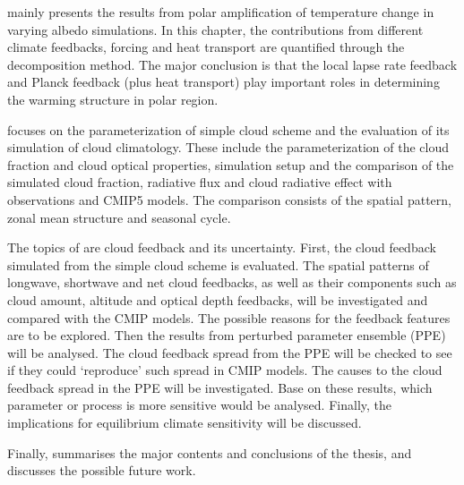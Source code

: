  mainly presents the results from polar amplification of temperature change in varying albedo simulations. In this chapter, the contributions from different climate feedbacks, forcing and heat transport are quantified through the decomposition method. The major conclusion is that the local lapse rate feedback and Planck feedback (plus heat transport) play important roles in determining the warming structure in polar region.

 focuses on the parameterization of simple cloud scheme and the evaluation of its simulation of cloud climatology. These include the parameterization of the cloud fraction and cloud optical properties, simulation setup and the comparison of the simulated cloud fraction, radiative flux and cloud radiative effect with observations and CMIP5 models. The comparison consists of the spatial pattern, zonal mean structure and seasonal cycle. %

The topics of  are cloud feedback and its uncertainty. First, the cloud feedback simulated from the simple cloud scheme is evaluated. The spatial patterns of longwave, shortwave and net cloud feedbacks, as well as their components such as cloud amount, altitude and optical depth feedbacks, will be investigated and compared with the CMIP models. The possible reasons for the feedback features are to be explored. Then the results from perturbed parameter ensemble (PPE) will be analysed. The cloud feedback spread from the PPE will be checked to see if they could `reproduce' such spread in CMIP models. The causes to the cloud feedback spread in the PPE will be investigated. Base on these results, which parameter or process is more sensitive would be analysed. Finally, the implications for equilibrium climate sensitivity will be discussed.

Finally,  summarises the major contents and conclusions of the thesis, and discusses the possible future work.
